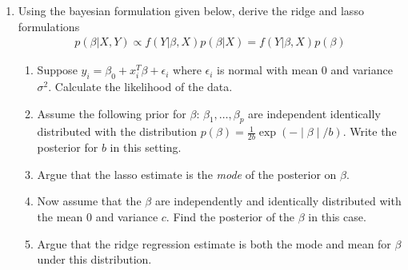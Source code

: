 \documentclass[../statistical_learning_notes.tex]{subfiles}
\begin{document}
\begin{enumerate}
        \item Using the bayesian formulation given below, derive the ridge and lasso formulations
        \begin{align*}
            p(\beta|X,Y) \propto f(Y|\beta,X)p(\beta|X) = f(Y|\beta,X)p(\beta)
        \end{align*}
        \begin{enumerate}
            \item Suppose $y_{i} = \beta_{0} + x_{i}^{T}\beta + \epsilon_{i}$ where $\epsilon_{i}$ is normal with mean $0$ and variance $\sigma^{2}$. Calculate the likelihood of the data.
            \item Assume the following prior for $\beta$: $\beta_{1},\ldots,\beta_{p}$ are independent identically distributed with the distribution $p(\beta) = \frac{1}{2b}\exp(-\mid \beta \mid/b)$. Write the posterior for $b$ in this setting.
            \item Argue that the lasso estimate is the \emph{mode} of the posterior on $\beta$.
            \item Now assume that the $\beta$ are independently and identically distributed with the mean $0$ and variance $c$. Find the posterior of the $\beta$ in this case.
            \item Argue that the ridge regression estimate is both the mode and mean for $\beta$ under this distribution.
        \end{enumerate}
    \end{enumerate}
\end{document}
